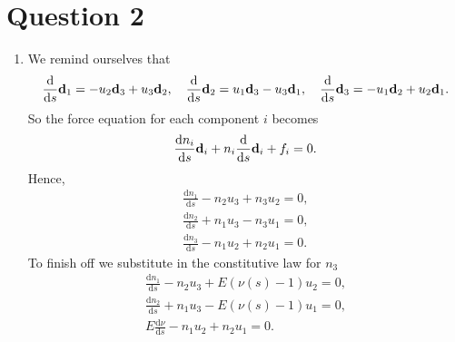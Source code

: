 \documentclass[]{article}
\newcommand{\rmd}{\mathrm{d}}
\newcommand{\deriv}[2]{\frac{\rmd#1}{\rmd #2}}
\begin{document}
\section*{Question 2}
\begin{enumerate}[label=(\alph*)]
\item{
We remind ourselves that
\begin{equation}
\deriv{}{s}{\bf d}_1 = -u_2{\bf d}_3 + u_3{\bf d}_2,\quad \deriv{}{s}{\bf d}_2 = u_1{\bf d}_3 - u_3{\bf d}_1,\quad  \deriv{}{s}{\bf d}_3 = -u_1{\bf d}_2 +u_2{\bf d}_1.
\end{equation}
So the force equation for each component $i$ becomes
\begin{equation}
\deriv{n_i}{s}{\bf d}_i + n_i\deriv{}{s}{\bf d}_i + f_i=0. 
\end{equation}
Hence,
\begin{align}
\deriv{n_1}{s}-n_2u_3 + n_3 u_2 =0,\\
\nonumber\deriv{n_2}{s}+n_1u_3 - n_3 u_1 =0,\\
\nonumber\deriv{n_3}{s}-n_1u_2 + n_2 u_1 =0.
\end{align}
To finish off we substitute in the constitutive law for $n_3$
\begin{align}
\deriv{n_1}{s}-n_2u_3 + E(\nu(s)-1)u_2 =0,\\
\nonumber\deriv{n_2}{s}+n_1u_3 -E(\nu(s)-1) u_1 =0,\\
\nonumber E\deriv{\nu}{s}-n_1u_2 + n_2 u_1 =0.
\end{align}

}
\end{enumerate}
\end{document}
